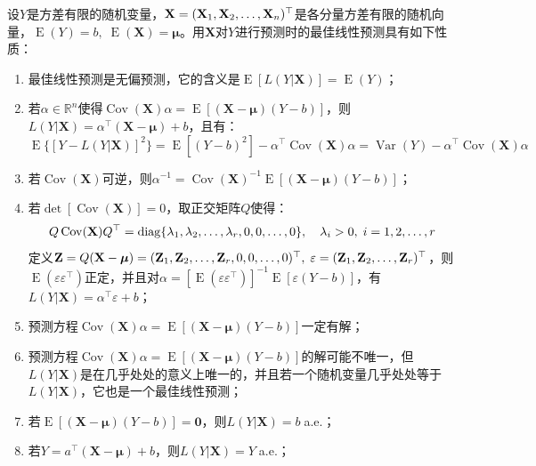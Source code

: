 \begin{property}\label{prop:BestLinearForcast}
	设$Y$是方差有限的随机变量，$\mathbf{X}=(\mathbf{X}_1, \mathbf{X}_2, \dots, \mathbf{X}_{n})^{\top}$是各分量方差有限的随机向量，$\operatorname{E}(Y)=b,\;\operatorname{E}(\mathbf{X})=\boldsymbol{\mu}$。用$\mathbf{X}$对$Y$进行预测时的最佳线性预测具有如下性质：
	\begin{enumerate}
		\item 最佳线性预测是无偏预测，它的含义是$\operatorname{E}[L(Y|\mathbf{X})]=\operatorname{E}(Y)$；
		\item 若$\alpha\in\mathbb{R}^{n}$使得$\operatorname{Cov}(\mathbf{X})\alpha=\operatorname{E}[(\mathbf{X}-\boldsymbol{\mu})(Y-b)]$，则$L(Y|\mathbf{X})=\alpha^{\top}(\mathbf{X}-\boldsymbol{\mu})+b$，且有：
		\begin{equation*}
			\operatorname{E}\{[Y-L(Y|\mathbf{X})]^2\}=\operatorname{E}[(Y-b)^2]-\alpha^{\top}\operatorname{Cov}(\mathbf{X})\alpha=\operatorname{Var}(Y)-\alpha^{\top}\operatorname{Cov}(\mathbf{X})\alpha
		\end{equation*}
		\item 若$\operatorname{Cov}(\mathbf{X})$可逆，则$\alpha^{-1}=\operatorname{Cov}(\mathbf{X})^{-1}\operatorname{E}[(\mathbf{X}-\boldsymbol{\mu})(Y-b)]$；
		\item 若$\det[\operatorname{Cov}(\mathbf{X})]=0$，取正交矩阵$Q$使得：
		\begin{equation*}
			Q\operatorname{Cov}(\mathbf{X})Q^{\top}=\operatorname{diag}\{\lambda_1, \lambda_2, \dots, \lambda_{r},0,0,\dots,0\},\quad\lambda_i>0,\;i=1,2,\dots,r
		\end{equation*}
		定义$\mathbf{Z}=Q(\mathbf{X}-\boldsymbol{\mu})=(\mathbf{Z}_1, \mathbf{Z}_2, \dots, \mathbf{Z}_{r},0,0,\dots,0)^{\top},\;\varepsilon=(\mathbf{Z}_1, \mathbf{Z}_2, \dots, \mathbf{Z}_{r})^{\top}$，则$\operatorname{E}(\varepsilon\varepsilon^{\top})$正定，并且对$\alpha=[\operatorname{E}(\varepsilon\varepsilon^{\top})]^{-1}\operatorname{E}[\varepsilon(Y-b)]$，有$L(Y|\mathbf{X})=\alpha^{\top}\varepsilon+b$；
		\item 预测方程$\operatorname{Cov}(\mathbf{X})\alpha=\operatorname{E}[(\mathbf{X}-\boldsymbol{\mu})(Y-b)]$一定有解；
		\item 预测方程$\operatorname{Cov}(\mathbf{X})\alpha=\operatorname{E}[(\mathbf{X}-\boldsymbol{\mu})(Y-b)]$的解可能不唯一，但$L(Y|\mathbf{X})$是在几乎处处的意义上唯一的，并且若一个随机变量几乎处处等于$L(Y|\mathbf{X})$，它也是一个最佳线性预测；
		\item 若$\operatorname{E}[(\mathbf{X}-\boldsymbol{\mu})(Y-b)]=\mathbf{0}$，则$L(Y|\mathbf{X})=b\;$a.e.；
		\item 若$Y=a^{\top}(\mathbf{X}-\boldsymbol{\mu})+b$，则$L(Y|\mathbf{X})=Y\;$a.e.；

\end{enumerate}
\end{property}
